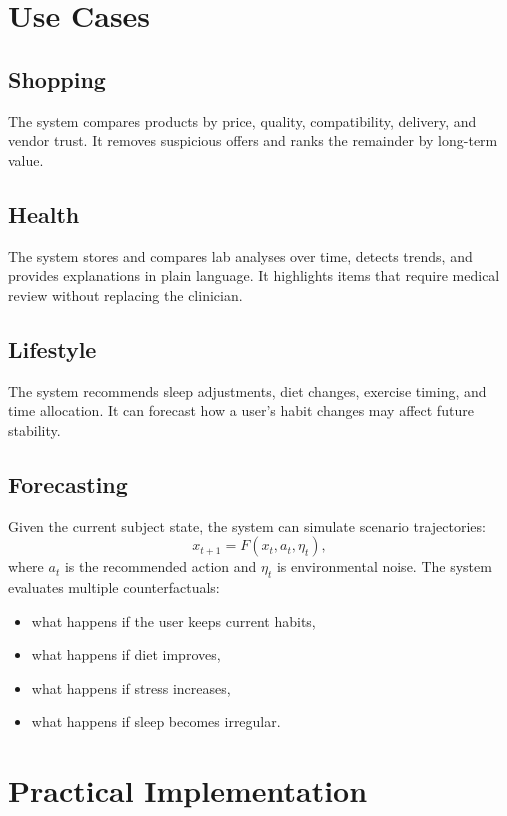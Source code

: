 \documentclass[11pt,a4paper]{article}
\begin{document}
\section{Use Cases}

\subsection{Shopping}
The system compares products by price, quality, compatibility, delivery, and vendor trust. It removes suspicious offers and ranks the remainder by long-term value.

\subsection{Health}
The system stores and compares lab analyses over time, detects trends, and provides explanations in plain language. It highlights items that require medical review without replacing the clinician.

\subsection{Lifestyle}
The system recommends sleep adjustments, diet changes, exercise timing, and time allocation. It can forecast how a user's habit changes may affect future stability.

\subsection{Forecasting}
Given the current subject state, the system can simulate scenario trajectories:
\[
x_{t+1} = F(x_t, a_t, \eta_t),
\]
where $a_t$ is the recommended action and $\eta_t$ is environmental noise. The system evaluates multiple counterfactuals:
\begin{itemize}[leftmargin=1.2em]
    \item what happens if the user keeps current habits,
    \item what happens if diet improves,
    \item what happens if stress increases,
    \item what happens if sleep becomes irregular.
\end{itemize}

\section{Practical Implementation}
\end{document}
